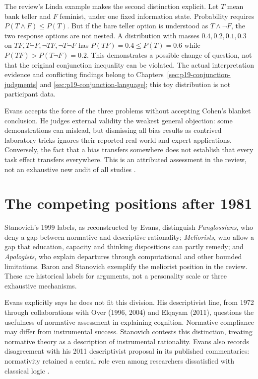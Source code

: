 The review's Linda example makes the second distinction explicit.  Let
\(T\) mean bank teller and \(F\) feminist, under one fixed information
state.  Probability requires \(P(T\land F)\leq P(T)\).
But if the bare teller option is understood as \(T\land\neg F\), the
two response options are not nested.  A distribution with masses
\(0.4,0.2,0.1,0.3\) on \(TF,T\neg F,\neg TF,\neg T\neg F\)
has \(P(TF)=0.4\leq P(T)=0.6\) while
\(P(TF)>P(T\neg F)=0.2\).  This demonstrates a possible change of
question, not that the original conjunction inequality can be violated.
The actual interpretation evidence and conflicting findings belong to
Chapters~\ref{sec:p19-conjunction-judgments} and
\ref{sec:p19-conjunction-language}; this toy distribution is not participant data.

Evans accepts the force of the three problems without accepting Cohen's
blanket conclusion.  He judges external validity the weakest general objection:
some demonstrations can mislead, but dismissing all bias results as contrived
laboratory tricks ignores their reported real-world and expert applications.
Conversely, the fact that a bias transfers somewhere does not establish that
every task effect transfers everywhere.  This is an attributed assessment in
the review, not an exhaustive new audit of all studies
\parencite[pp.~91--92]{Evans2021RationalityDebate}.

\section{The competing positions after 1981}

Stanovich's 1999 labels, as reconstructed by Evans, distinguish
\emph{Panglossians}, who deny a gap between normative and descriptive
rationality; \emph{Meliorists}, who allow a gap that education, capacity and
thinking dispositions can partly remedy; and \emph{Apologists}, who explain
departures through computational and other bounded limitations.  Baron and
Stanovich exemplify the meliorist position in the review.  These are historical
labels for arguments, not a personality scale or three exhaustive mechanisms.

Evans explicitly says he does not fit this division.  His descriptivist line,
from 1972 through collaborations with Over (1996, 2004) and Elqayam (2011),
questions the usefulness of normative assessment in explaining cognition.
Normative compliance may differ from instrumental success.  Stanovich
contests this distinction, treating normative theory as a description of
instrumental rationality.  Evans also records disagreement with his 2011
descriptivist proposal in its published commentaries: normativity retained
a central role even among researchers dissatisfied with classical logic
\parencite[p.~92]{Evans2021RationalityDebate}.

